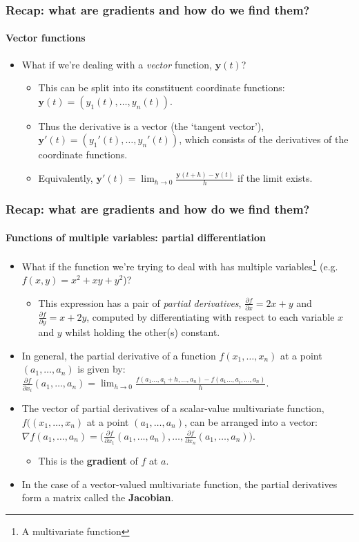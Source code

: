 \documentclass[\beamerclass]{beamer}
\begin{document}
\begin{frame}
\frametitle{Recap: what are gradients and how do we find them?}
\framesubtitle{Vector functions}
\begin{itemize}
	\item<+-> What if we're dealing with a \emph{vector} function, $\bm y(t)$?
	\begin{itemize}
		\item<+-> This can be split into its constituent coordinate functions: $\bm y(t) = (y_1(t),\dots,y_n(t))$.
		\item<+-> Thus the derivative is a vector (the `tangent vector'), $\bm y'(t)=(y_1'(t),\dots,y_n'(t))$, which consists of the derivatives of the coordinate functions.
		\item<+-> Equivalently, $\bm y'(t) = \lim_{h\to0} \frac{\bm y(t+h) - \bm y(t)}{h}$ if the limit exists.
	\end{itemize}
\end{itemize}
\end{frame}

\begin{frame}
\frametitle{Recap: what are gradients and how do we find them?}
\framesubtitle{Functions of multiple variables: partial differentiation}

\begin{itemize}
	\item What if the function we're trying to deal with has multiple variables\footnote{A multivariate function} (e.g. $f(x, y) = x^2 + xy + y^2$)?
	\begin{itemize}
		\item<+-> This expression has a pair of \emph{partial derivatives}, $\frac{\partial f}{\partial x} = 2x+y$ and $\frac{\partial f}{\partial y} = x + 2y$, computed by differentiating with respect to each variable $x$ and $y$ whilst holding the other(s) constant.
	\end{itemize}
	\item<+-> In general, the partial derivative of a function $f(x_1,\dots,x_n)$ at a point $(a_1,\dots,a_n)$ is given by: \\ $\frac{\partial f}{\partial x_i}(a_1,\dots,a_n) = \lim_{h\to0}\frac{f(a_1\dots,a_i+h,\dots,a_n)-f(a_1\dots,a_i,\dots,a_n)}{h}$.
	\item<+-> The vector of partial derivatives of a scalar-value multivariate function, $f((x_1,\dots,x_n)$ at a point $(a_1,\dots,a_n)$, can be arranged into a vector:
	$\nabla f(a_1,\dots,a_n) = \big(\frac{\partial f}{\partial x_1}(a_1,\dots,a_n), \dots, \frac{\partial f}{\partial x_n}(a_1,\dots,a_n) \big)$.
	\begin{itemize}
		\item<+-> This is the \textbf{gradient} of $f$ at $a$.
	\end{itemize}
	\item<+-> In the case of a vector-valued multivariate function, the partial derivatives form a matrix called the \textbf{Jacobian}.
\end{itemize}
\end{frame}
\end{document}
